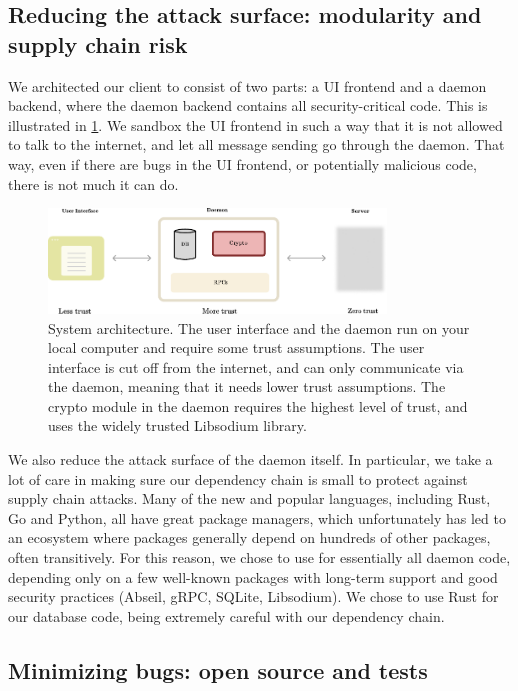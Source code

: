 \subsection{Reducing the attack surface: modularity and supply chain risk}

We architected our client to consist of two parts: a UI frontend and a daemon backend, where the daemon backend contains all security-critical code. This is illustrated in \cref{fig:systemdiagram}. We sandbox the UI frontend in such a way that it is not allowed to talk to the internet, and let all message sending go through the daemon. That way, even if there are bugs in the UI frontend, or potentially malicious code, there is not much it can do.

\begin{figure}
    \centering
    \includegraphics[width=0.8\textwidth]{systemdiagram.pdf}
\caption{System architecture. The user interface and the daemon run on your local computer and require some trust assumptions. The user interface is cut off from the internet, and can only communicate via the daemon, meaning that it needs lower trust assumptions. The crypto module in the daemon requires the highest level of trust, and uses the widely trusted Libsodium library.}
\label{fig:systemdiagram}
\end{figure}

We also reduce the attack surface of the daemon itself. In particular, we take a lot of care in making sure our dependency chain is small to protect against supply chain attacks. Many of the new and popular languages, including Rust, Go and Python, all have great package managers, which unfortunately has led to an ecosystem where packages generally depend on hundreds of other packages, often transitively. For this reason, we chose to use \Cpp for essentially all daemon code, depending only on a few well-known packages with long-term support and good security practices (Abseil, gRPC, SQLite, Libsodium). We chose to use Rust for our database code, being extremely careful with our dependency chain.

\subsection{Minimizing bugs: open source and tests}

